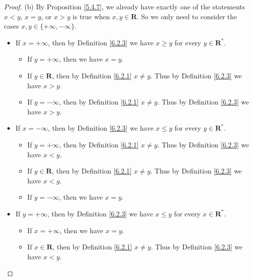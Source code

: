 \begin{proof}{(b)}
      By Proposition \ref{5.4.7}, we already have exactly one of the statements \(x < y\), \(x = y\), or \(x > y\) is true when \(x, y \in \mathbf{R}\).
      So we only need to consider the cases \(x, y \in \{+\infty, -\infty\}\).
      \begin{itemize}
            \item If \(x = +\infty\), then by Definition \ref{6.2.3} we have \(x \geq y\) for every \(y \in \mathbf{R}^*\).
                  \begin{itemize}
                        \item If \(y = +\infty\), then we have \(x = y\).
                        \item If \(y \in \mathbf{R}\), then by Definition \ref{6.2.1} \(x \neq y\).
                              Thus by Definition \ref{6.2.3} we have \(x > y\).
                        \item If \(y = -\infty\), then by Definition \ref{6.2.1} \(x \neq y\).
                              Thus by Definition \ref{6.2.3} we have \(x > y\).
                  \end{itemize}
            \item If \(x = -\infty\), then by Definition \ref{6.2.3} we have \(x \leq y\) for every \(y \in \mathbf{R}^*\).
                  \begin{itemize}
                        \item If \(y = +\infty\), then by Definition \ref{6.2.1} \(x \neq y\).
                              Thus by Definition \ref{6.2.3} we have \(x < y\).
                        \item If \(y \in \mathbf{R}\), then by Definition \ref{6.2.1} \(x \neq y\).
                              Thus by Definition \ref{6.2.3} we have \(x < y\).
                        \item If \(y = -\infty\), then we have \(x = y\).
                  \end{itemize}
            \item If \(y = +\infty\), then by Definition \ref{6.2.3} we have \(x \leq y\) for every \(x \in \mathbf{R}^*\).
                  \begin{itemize}
                        \item If \(x = +\infty\), then we have \(x = y\).
                        \item If \(x \in \mathbf{R}\), then by Definition \ref{6.2.1} \(x \neq y\).
                              Thus by Definition \ref{6.2.3} we have \(x < y\).

\end{itemize}
\end{itemize}
\end{proof}
